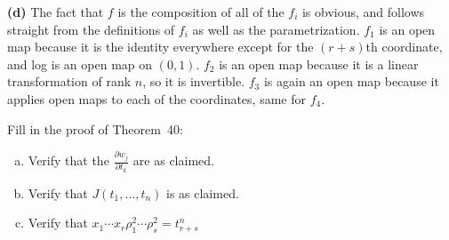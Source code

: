 \documentclass[11pt,letterpaper]{article}
\begin{document}
\begin{solution}
    \textbf{(d)} The fact that $f$ is the composition of all of the $f_i$ is obvious, and follows straight from the definitions of $f_i$ as well as the parametrization. $f_1$ is an open map because it is the identity everywhere except for the $(r+s)$th coordinate, and log is an open map on $(0,1)$. $f_2$ is an open map because it is a linear transformation of rank $n$, so it is invertible. $f_3$ is again an open map because it applies open maps to each of the coordinates, same for $f_4$.
\end{solution}

\begin{cproblem}{6.2}
    Fill in the proof of Theorem~40:
    \begin{enumerate}[(a)]
        \item Verify that the $\frac{\partial w_j}{\partial t_k}$ are as claimed.
        \item Verify that $J(t_1,\ldots,t_n)$ is as claimed.
        \item Verify that $x_1\cdots x_r\rho^2_1\cdots\rho^2_s=t^n_{r+s}$ 
    \end{enumerate}
\end{cproblem}
\end{document}
